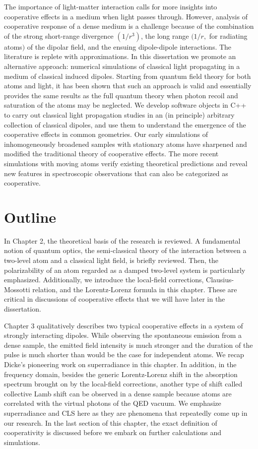 The importance of light-matter interaction calls for more insights into cooperative effects in a medium when light passes through. However, analysis of cooperative response of a dense medium is a challenge because of the combination of the strong short-range divergence $(1/r^3)$, the long range $(1/r, $ for radiating atoms$)$ of the dipolar field, and the ensuing dipole-dipole interactions. The literature is replete with approximations\cite{FRIEDBERG1973101}. In this dissertation we promote an alternative approach: numerical simulations of classical light propagating in a medium of classical induced dipoles. Starting from quantum field theory for both atoms and light, it has been shown\cite{PhysRevA.55.513} that such an approach is valid and essentially provides the same results as the full quantum theory when photon recoil and saturation of the atoms may be neglected. We develop software objects in C++ to carry out classical light propagation studies in an (in principle) arbitrary collection of classical dipoles, and use them to understand the emergence of the cooperative effects in common geometries. Our early simulations of inhomogeneously broadened samples with stationary atoms have sharpened and modified the traditional theory of cooperative effects. The more recent simulations with moving atoms verify existing theoretical predictions and reveal new features in spectroscopic observations that can also be categorized as cooperative.


\section{Outline}

In Chapter 2, the theoretical basis of the research is reviewed. A fundamental notion of quantum optics, the semi-classical theory of the interaction between a two-level atom and a classical light field, is briefly reviewed. Then, the polarizability of an atom regarded as a damped two-level system is particularly emphasized. Additionally, we introduce the local-field corrections,  Clausius-Mossotti relation, and the Lorentz-Lorenz formula in this chapter. These are critical in discussions of cooperative effects that we will have later in the dissertation.

Chapter 3 qualitatively describes two typical cooperative effects in a system of strongly interacting dipoles. While observing the spontaneous emission from a dense sample, the emitted field intensity is much stronger and the duration of the pulse is much shorter than would be the case for  independent atoms. We recap Dicke's pioneering work on superradiance in this chapter. In addition, in the frequency domain, besides the generic Lorentz-Lorenz shift  in the absorption spectrum brought on by the local-field corrections, another type of shift called collective Lamb shift can be observed in a dense sample because atoms are correlated with the virtual photons of the QED vacuum. We emphasize superradiance and CLS here as they are phenomena that repeatedly come up in our research. In the last section of this chapter, the exact definition of cooperativity is discussed before we embark on further calculations and simulations.

